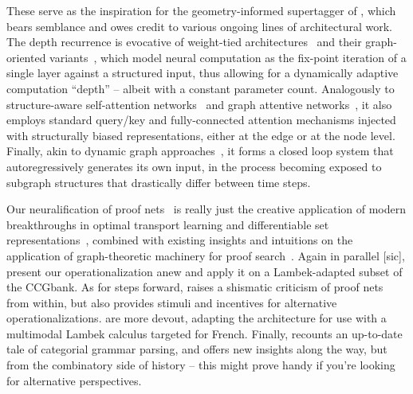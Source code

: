 These serve as the inspiration for the geometry-informed supertagger of \citet{kogkalidis2022geometryaware}, which bears semblance and owes credit to various ongoing lines of architectural work.
The depth recurrence is evocative of weight-tied architectures~\cite{dehghani2018universal,bai2019deep} and their graph-oriented variants~\cite{li2016gated}, which model neural computation as the fix-point iteration of a single layer against a structured input, thus allowing for a dynamically adaptive computation ``depth'' -- albeit with a constant parameter count.
Analogously to structure-aware self-attention networks~\cite[inter alia]{zhu-etal-2019-modeling,cai2020graph} and graph attentive networks~\cite[inter alia]{velivckovic2018graph,yun2019graph,ying2021transformers,brody2021attentive}, it also employs standard query/key and fully-connected attention mechanisms injected with structurally biased representations, either at the edge or at the node level.
Finally, akin to dynamic graph approaches~\cite{liao2019efficient,pareja2020evolvegcn}, it forms a closed loop system that autoregressively generates its own input, in the process becoming exposed to subgraph structures that drastically differ between time steps.

Our neuralification of proof nets~\cite{kogkalidis-etal-2020-neural} is really just the creative application of modern breakthroughs in optimal transport learning and differentiable set representations~\cite[inter alia]{cuturi2013sinkhorn,mena2018learning,grover2018stochastic,peyre2019computational}, combined with existing insights and intuitions on the application of graph-theoretic machinery for proof search~\cite{moot2008graph}.
Again in parallel [sic], \citet{bhargava2021proof} present our operationalization anew and apply it on a Lambek-adapted subset of the CCGbank.
As for steps forward, \citet{moot2022perspectives} raises a shismatic criticism of proof nets from within, but also provides stimuli and incentives for alternative operationalizations.
 are more devout, adapting the architecture for use with a multimodal Lambek calculus targeted for French. 
Finally, \citet{DBLP:journals/corr/abs-2109-10044} recounts an up-to-date tale of categorial grammar parsing, and offers new insights along the way, but from the combinatory side of history -- this might prove handy if you're looking for alternative perspectives.




